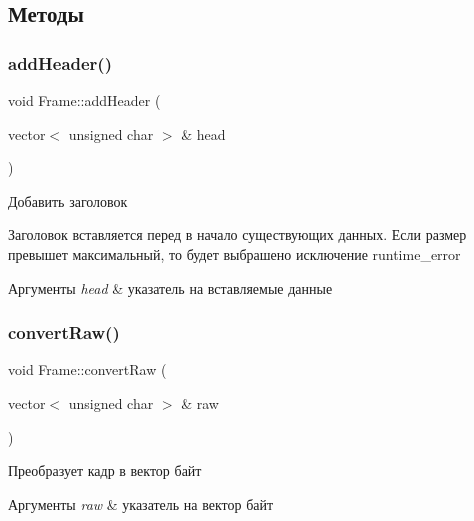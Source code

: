 \subsection{Методы}
\mbox{\label{classFrame_ae845a5e715edc77627ca09a68ec02b81}} 
\subsubsection{\texorpdfstring{add\+Header()}{addHeader()}}
{\footnotesize\ttfamily void Frame\+::add\+Header (\begin{DoxyParamCaption}\item[{vector$<$ unsigned char $>$ \&}]{head }\end{DoxyParamCaption})}



Добавить заголовок 

Заголовок вставляется перед в начало существующих данных. Если размер превышет максимальный, то будет выбрашено исключение runtime\+\_\+error 
\begin{DoxyParams}{Аргументы}
{\em head} & указатель на вставляемые данные \\
\hline
\end{DoxyParams}
\mbox{\label{classFrame_aa8b25be717e5d4879629b2c19afc4c8d}} 
\subsubsection{\texorpdfstring{convert\+Raw()}{convertRaw()}}
{\footnotesize\ttfamily void Frame\+::convert\+Raw (\begin{DoxyParamCaption}\item[{vector$<$ unsigned char $>$ \&}]{raw }\end{DoxyParamCaption})}



Преобразует кадр в вектор байт 


\begin{DoxyParams}{Аргументы}
{\em raw} & указатель на вектор байт \\
\hline
\end{DoxyParams}
\mbox{\label{classFrame_a5a966008fbd55ba69ef8cff07ca39bf4}} 
